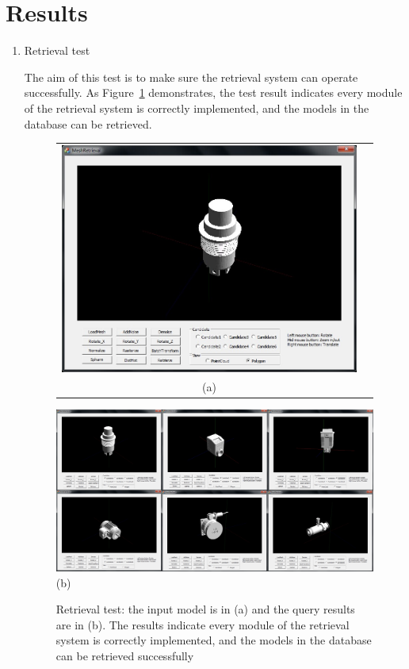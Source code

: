 \section{Results} \label{sec:results}

\begin{enumerate}
\item Retrieval test

The aim of this test is to make sure the retrieval system can operate successfully. As Figure~\ref{retrievaltest_UI} demonstrates, the test result indicates every module of the retrieval system is correctly implemented, and the models in the database can be retrieved. 

\begin{figure}
\begin{center}
\begin{tabular}{cc}   %
   \includegraphics[width=0.6\linewidth]{input_initialdesign}  \\
   (a) \\
\end{tabular}
   \includegraphics[width=1\linewidth]{output_finaldesign}  \\
   (b)  \\
\caption{Retrieval test: the input model is in (a) and the query results are in (b). The results indicate every module of the retrieval system is correctly implemented, and the models in the database can be retrieved successfully} 
  \label{retrievaltest_UI}
\end{center}
\end{figure}


\end{enumerate}
